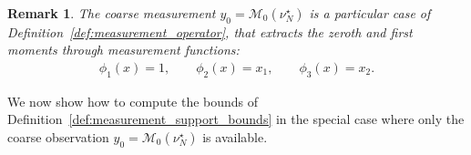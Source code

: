 \documentclass[11pt,a4paper]{article}
\theoremstyle{proposition}
\newtheorem{remark}[theorem]{Remark}
\begin{document}
\begin{remark}
    The coarse measurement $y_0=\mathcal M_0(\nu_N^\star)$ is a particular case of Definition~\ref{def:measurement_operator}, that extracts the zeroth and first moments through measurement functions:
    \begin{align}
        \phi_1(x)=1,\qquad
        \phi_2(x)=x_1,\qquad
        \phi_3(x)=x_2.
    \end{align}
\end{remark}


We now show how to compute the bounds of Definition~\ref{def:measurement_support_bounds} in the special case where only the coarse observation $y_0=\mathcal M_0(\nu_N^\star)$ is available.
\end{document}
